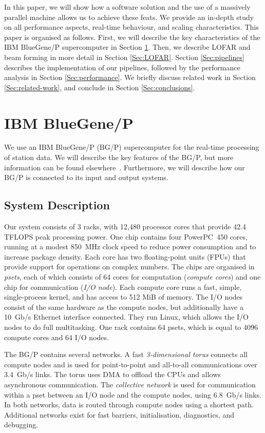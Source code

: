 \documentclass{llncs}
\begin{document}
In this paper, we will show how a software solution and the use of a massively parallel machine allows us to achieve these feats. We provide an in-depth study on all performance aspects, real-time behaviour, and scaling characteristics. This paper is organised as follows. First, we will describe the key characteristics of the IBM BlueGene/P supercomputer in Section \ref{Sec:bluegene}. Then, we describe LOFAR and beam forming in more detail in Section \ref{Sec:LOFAR}. Section \ref{Sec:pipelines} describes the implementation of our pipelines, followed by the performance analysis in Section \ref{Sec:performance}. We briefly discuss related work in Section \ref{Sec:related-work}, and conclude in Section \ref{Sec:conclusions}.

\section{IBM BlueGene/P}
\label{Sec:bluegene}

We use an IBM BlueGene/P (BG/P) supercomputer for the real-time processing of station data. We will describe the key features of the BG/P, but more information can be found elsewhere~\cite{IBM:08}. Furthermore, we will describe how our BG/P is connected to its input and output systems.

\subsection{System Description}

Our system consists of 3 racks, with 12,480 processor cores that provide 42.4 TFLOPS peak processing power. One chip contains four PowerPC~450 cores, running at a modest 850~MHz clock speed to reduce power consumption and to increase package density. Each core has two floating-point units (FPUs) that provide support for operations on complex numbers. The chips are organised in \emph{psets}, each of which consists of 64 cores for computation (\emph{compute cores}) and one chip for communication (\emph{I/O node}). Each compute core runs a fast, simple, single-process kernel,  and has access to 512 MiB of memory. The I/O nodes consist of the same hardware as the compute nodes, but additionally have a 10~Gb/s Ethernet interface connected. They run Linux, which allows the I/O nodes to do full multitasking. One rack contains 64 psets, which is equal to 4096 compute cores and 64 I/O nodes.

The BG/P contains several networks. A fast \emph{3-dimensional torus\/} connects all compute nodes and is used for point-to-point and all-to-all communications over 3.4~Gb/s links. The torus uses DMA to offload the CPUs and allows asynchronous communication. The \emph{collective network\/} is used for communication within a pset between an I/O node and the compute nodes, using 6.8~Gb/s links. In both networks, data is routed through compute nodes using a shortest path. Additional networks exist for fast barriers, initialisation, diagnostics, and debugging.
\end{document}
